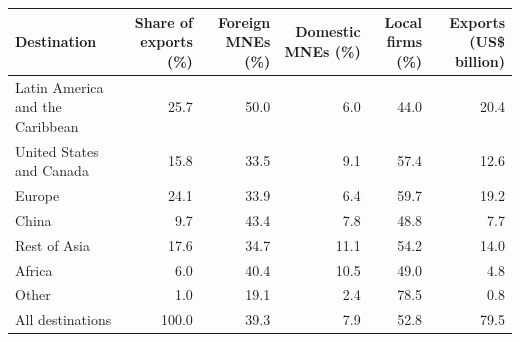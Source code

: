 \begin{tabular}{lrrrrr}
\toprule
Destination & Share of exports (\%) & Foreign MNEs (\%) & Domestic MNEs (\%) & Local firms (\%) & Exports (US\$ billion) \\
\midrule
Latin America and the Caribbean & 25.7 & 50.0 & 6.0 & 44.0 & 20.4 \\
United States and Canada & 15.8 & 33.5 & 9.1 & 57.4 & 12.6 \\
Europe & 24.1 & 33.9 & 6.4 & 59.7 & 19.2 \\
China & 9.7 & 43.4 & 7.8 & 48.8 & 7.7 \\
Rest of Asia & 17.6 & 34.7 & 11.1 & 54.2 & 14.0 \\
Africa & 6.0 & 40.4 & 10.5 & 49.0 & 4.8 \\
Other & 1.0 & 19.1 & 2.4 & 78.5 & 0.8 \\
\midrule
All destinations & 100.0 & 39.3 & 7.9 & 52.8 & 79.5 \\
\bottomrule
\end{tabular}
